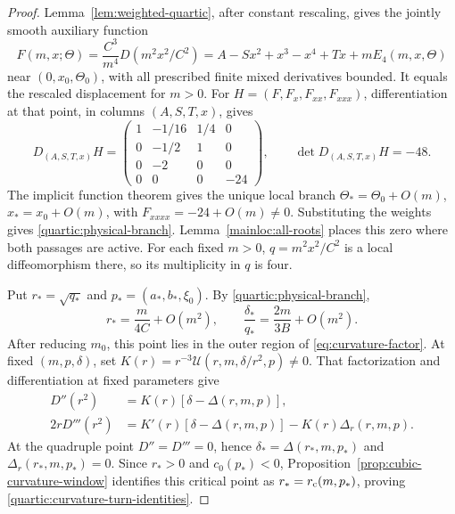 \begin{proof}
Lemma~\ref{lem:weighted-quartic}, after constant rescaling, gives the
jointly smooth auxiliary function
\begin{equation}\label{quartic:joint-quotient}
 F(m,x;\Theta)=\frac{C^3}{m^4}D(m^2x^2/C^2)
 =A-Sx^2+x^3-x^4+Tx+mE_4(m,x,\Theta)
\end{equation}
near $(0,x_0,\Theta_0)$, with all prescribed finite mixed derivatives
bounded. It equals the rescaled displacement for $m>0$.
For $H=(F,F_x,F_{xx},F_{xxx})$, differentiation at that point,
in columns $(A,S,T,x)$, gives
\[
 D_{(A,S,T,x)}H=
 \begin{pmatrix}
 1&-1/16&1/4&0\\
 0&-1/2&1&0\\
 0&-2&0&0\\
 0&0&0&-24
 \end{pmatrix},\qquad \det D_{(A,S,T,x)}H=-48.
\]
The implicit function theorem gives the unique local branch
$\Theta_* =\Theta_0+O(m)$, $x_*=x_0+O(m)$, with
$F_{xxxx}=-24+O(m)\ne0$. Substituting the weights gives
\eqref{quartic:physical-branch}. Lemma~\ref{mainloc:all-roots}
places this zero where both passages are active. For each fixed $m>0$,
$q=m^2x^2/C^2$ is a local diffeomorphism there, so its
multiplicity in $q$ is four.

Put $r_*=\sqrt{q_*}$ and $p_*=(a_*,b_*,\xi_0)$. By
\eqref{quartic:physical-branch},
\[
 r_*=\frac{m}{4C}+O(m^2),\qquad
 \frac{\delta_*}{q_*}=\frac{2m}{3B}+O(m^2).
\]
After reducing $m_0$, this point lies in the outer region of
\eqref{eq:curvature-factor}. At fixed $(m,p,\delta)$, set
$K(r)=r^{-3}\mathcal U(r,m,\delta/r^2,p)\ne0$. That factorization
and differentiation at fixed parameters give
\[
 \begin{aligned}
 D''(r^2)&=K(r)[\delta-\Delta(r,m,p)],\\
 2rD'''(r^2)&=K'(r)[\delta-\Delta(r,m,p)]-K(r)\Delta_r(r,m,p).
 \end{aligned}
\]
At the quadruple point $D''=D'''=0$, hence
$\delta_*=\Delta(r_*,m,p_*)$ and $\Delta_r(r_*,m,p_*)=0$.
Since $r_*>0$ and $c_0(p_*)<0$,
Proposition~\ref{prop:cubic-curvature-window} identifies this critical
point as $r_*=r_{\rm c}(m,p_*)$, proving
\eqref{quartic:curvature-turn-identities}.


\end{proof}
